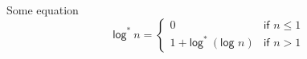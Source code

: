 \documentclass{beamer}
\begin{document}
\begin{frame}
    \begin{block}{Some equation}
        \begin{equation}
            \textsf{log}^*\ n=\left\{
                \begin{array}{ll}
                  0 & \textsf{if }n \leq 1\\
                  1 + \textsf{log}^*~(\textsf{log }n) & \textsf{if } n > 1
                \end{array}
              \right.
        \end{equation}
    \end{block}
\end{frame}
\end{document}
